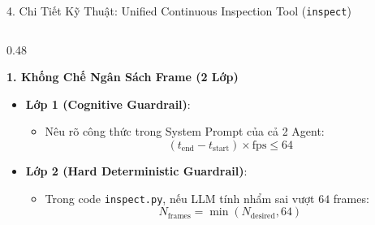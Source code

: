 \documentclass[aspectratio=169, 10pt]{beamer}
\begin{document}
\begin{frame}{4. Chi Tiết Kỹ Thuật: Unified Continuous Inspection Tool (\texttt{inspect})}
    \begin{columns}[T]
        \begin{column}{0.48\textwidth}
            \begin{block}{\textbf{1. Khống Chế Ngân Sách Frame (2 Lớp)}}
                \begin{itemize}
                    \item \textbf{Lớp 1 (Cognitive Guardrail)}:
                    \begin{itemize}\footnotesize
                        \item Nêu rõ công thức trong System Prompt của cả 2 Agent:
                        $$(t_{\text{end}} - t_{\text{start}}) \times \text{fps} \le 64$$
                    \end{itemize}
                    \item \textbf{Lớp 2 (Hard Deterministic Guardrail)}:
                    \begin{itemize}\footnotesize
                        \item Trong code \texttt{inspect.py}, nếu LLM tính nhẩm sai vượt $64$ frames:
                        $$N_{\text{frames}} = \min(N_{\text{desired}}, 64)$$
                        
                    \end{itemize}
                \end{itemize}
            \end{block}
        \end{column}


\end{columns}
\end{frame}
\end{document}
